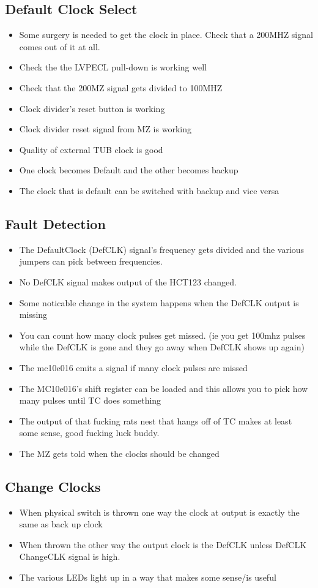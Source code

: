 \documentclass[11pt,a4paper]{article}
\begin{document}
\subsection{Default Clock Select}
\begin{itemize}
\item Some surgery is needed to get the clock in place. Check that a 200MHZ signal comes out of it at all.
\item Check the the LVPECL pull-down is working well
\item Check that the 200MZ signal gets divided to 100MHZ
\item Clock divider's reset button is working
\item Clock divider reset signal from MZ is working
\item Quality of external TUB clock is good
\item One clock becomes Default and the other becomes backup
\item The clock that is default can be switched with backup and vice versa
\end{itemize}
\subsection{Fault Detection}
\begin{itemize}
\item The DefaultClock (DefCLK) signal's frequency gets divided and the various jumpers can pick between frequencies.
\item No DefCLK signal makes output of the HCT123 changed.
\item Some noticable change in the system happens when the DefCLK output is missing
\item You can count how many clock pulses get missed. (ie you get 100mhz pulses while the DefCLK is gone and they go away when DefCLK shows up again)
\item The mc10e016 emits a signal if many clock pulses are missed
\item The MC10e016's shift register can be loaded and this allows you to pick
how many pulses until TC does something 
\item The output of that fucking rats nest that hangs off of TC makes at least some sense, good fucking luck buddy.
\item The MZ gets told when the clocks should be changed
\end{itemize}
\subsection{Change Clocks}
\begin{itemize}
\item When physical switch is thrown one way the clock at output is exactly the same
as back up clock
\item When thrown the other way the output clock is the DefCLK unless DefCLK 
ChangeCLK signal is high.
\item The various LEDs light up in a way that makes some sense/is useful
\end{itemize}
\end{document}

